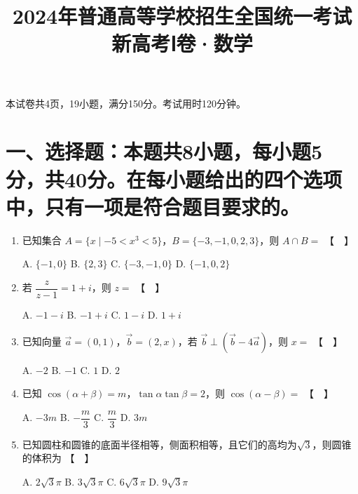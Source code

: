 \documentclass[12pt,a4paper]{article}
\title{2024年普通高等学校招生全国统一考试\\
       \large 新高考Ⅰ卷·数学}
\date{}
\begin{document}
\maketitle

\begin{center}
{\large 本试卷共4页，19小题，满分150分。考试用时120分钟。}
\end{center}

\section*{一、选择题：本题共8小题，每小题5分，共40分。在每小题给出的四个选项中，只有一项是符合题目要求的。}

\begin{enumerate}[label=\arabic*.]
\item 已知集合 $A=\{x \mid -5 < x^3 < 5\}$，$B=\{-3,-1,0,2,3\}$，则 $A \cap B =$ \hfill 【　】

A. $\{-1,0\}$ \quad B. $\{2,3\}$ \quad C. $\{-3,-1,0\}$ \quad D. $\{-1,0,2\}$

\vspace{0.3cm}

\item 若 $\dfrac{z}{z-1}=1+i$，则 $z=$ \hfill 【　】

A. $-1-i$ \quad B. $-1+i$ \quad C. $1-i$ \quad D. $1+i$

\vspace{0.3cm}

\item 已知向量 $\vec{a}=(0,1)$，$\vec{b}=(2,x)$，若 $\vec{b} \perp (\vec{b}-4\vec{a})$，则 $x=$ \hfill 【　】

A. $-2$ \quad B. $-1$ \quad C. $1$ \quad D. $2$

\vspace{0.3cm}

\item 已知 $\cos(\alpha+\beta)=m$，$\tan\alpha\tan\beta=2$，则 $\cos(\alpha-\beta)=$ \hfill 【　】

A. $-3m$ \quad B. $-\dfrac{m}{3}$ \quad C. $\dfrac{m}{3}$ \quad D. $3m$

\vspace{0.3cm}

\item 已知圆柱和圆锥的底面半径相等，侧面积相等，且它们的高均为$\sqrt{3}$，则圆锥的体积为 \hfill 【　】

A. $2\sqrt{3}\pi$ \quad B. $3\sqrt{3}\pi$ \quad C. $6\sqrt{3}\pi$ \quad D. $9\sqrt{3}\pi$


\end{enumerate}
\end{document}

